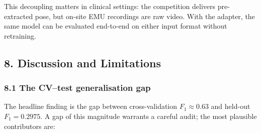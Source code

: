 \documentclass[
  11pt,
]{article}
\begin{document}
This decoupling matters in clinical settings: the competition delivers
pre-extracted pose, but on-site EMU recordings are raw video. With the
adapter, the same model can be evaluated end-to-end on either input
format without retraining.

\subsection{8. Discussion and
Limitations}\label{discussion-and-limitations}

\subsubsection{8.1 The CV--test generalisation
gap}\label{the-cvtest-generalisation-gap}

The headline finding is the gap between cross-validation
\(F_1 \approx 0.63\) and held-out \(F_1 = 0.2975\). A gap of this
magnitude warrants a careful audit; the most plausible contributors are:
\end{document}
